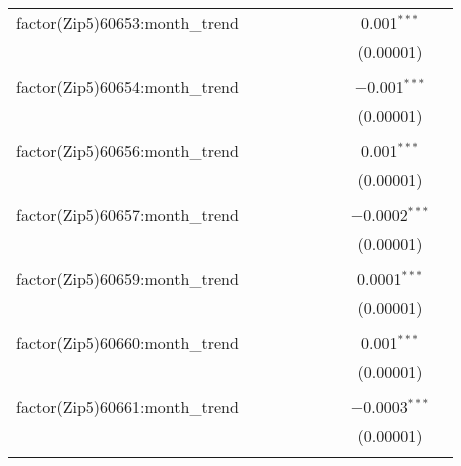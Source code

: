\begin{table}[H]
{\begin{tabular}{@{\extracolsep{5pt}}lcccccccc}
  factor(Zip5)60653:month\_trend &  &  &  &  &  &  & 0.001$^{***}$ &  \\  

   &  &  &  &  &  &  & (0.00001) &  \\  

   & & & & & & & & \\  

  factor(Zip5)60654:month\_trend &  &  &  &  &  &  & $-$0.001$^{***}$ &  \\  

   &  &  &  &  &  &  & (0.00001) &  \\  

   & & & & & & & & \\  

  factor(Zip5)60656:month\_trend &  &  &  &  &  &  & 0.001$^{***}$ &  \\  

   &  &  &  &  &  &  & (0.00001) &  \\  

   & & & & & & & & \\  

  factor(Zip5)60657:month\_trend &  &  &  &  &  &  & $-$0.0002$^{***}$ &  \\  

   &  &  &  &  &  &  & (0.00001) &  \\  

   & & & & & & & & \\  

  factor(Zip5)60659:month\_trend &  &  &  &  &  &  & 0.0001$^{***}$ &  \\  

   &  &  &  &  &  &  & (0.00001) &  \\  

   & & & & & & & & \\  

  factor(Zip5)60660:month\_trend &  &  &  &  &  &  & 0.001$^{***}$ &  \\  

   &  &  &  &  &  &  & (0.00001) &  \\  

   & & & & & & & & \\  

  factor(Zip5)60661:month\_trend &  &  &  &  &  &  & $-$0.0003$^{***}$ &  \\  

   &  &  &  &  &  &  & (0.00001) &  \\  

   & & & & & & & & \\  


\end{tabular}}
\end{table}
